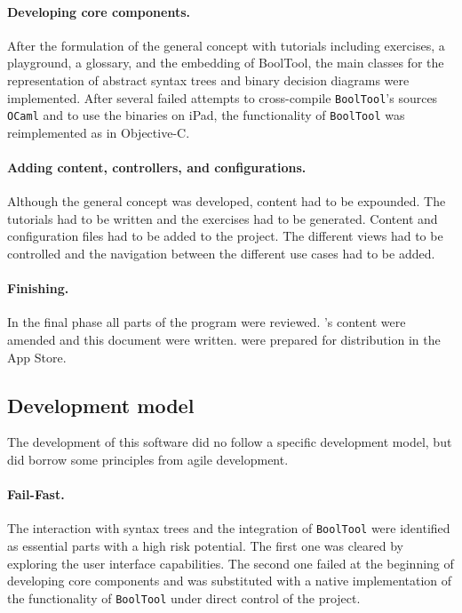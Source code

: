 \paragraph{Developing core components.}


After the formulation of the general concept with tutorials including 
exercises, a playground, a glossary, and the embedding of BoolTool,
the main classes for the representation of abstract syntax trees and binary decision diagrams were implemented.
After several failed attempts to cross-compile \verb=BoolTool='s sources \verb+OCaml+ 
and to use the binaries on iPad, the functionality of \verb+BoolTool+ was reimplemented as \BoolTool in Objective-C.

\paragraph{Adding content, controllers, and configurations.}

Although the general concept was developed, content had to be expounded. 
The tutorials had to be written and the exercises had to be generated. 
Content and configuration files had to be added to the project. 
The different views had to be controlled and the navigation between the different use cases had to be added. 

\paragraph{Finishing.} In the final phase all parts of the program were reviewed.
\Nyaya's content were amended and this document were written. 
\Nyaya were prepared for distribution in the App Store.

\subsection{Development model}

The development of this software did no follow a specific development model, 
but did borrow some principles from agile development.

\paragraph{Fail-Fast.} The interaction with syntax trees and 
the integration of \verb=BoolTool= were identified as essential parts with a high risk potential. 
The first one was cleared by exploring the user interface capabilities.
The second one failed at the beginning of developing core components 
and was substituted with a native implementation of the functionality of \verb=BoolTool=
under direct control of the project.


